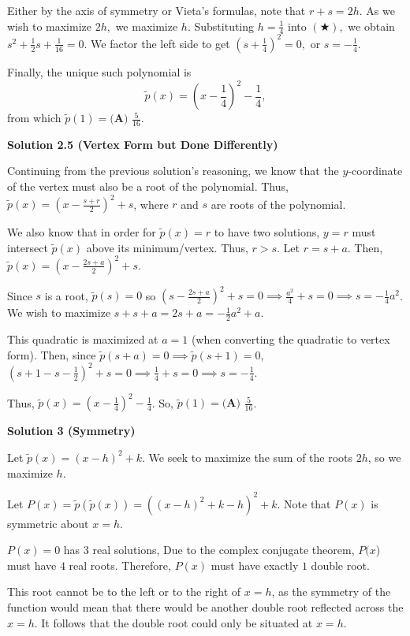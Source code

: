\begin{enumerate}
 Either by the axis of symmetry or Vieta's formulas, note that $r+s=2h.$ As we wish to maximize $2h,$ we maximize $h.$ Substituting $h=\frac14$ into $(\bigstar),$ we obtain $s^2+\frac12s+\frac{1}{16}=0.$ We factor the left side to get $\left(s+\frac14\right)^2=0,$ or $s=-\frac14.$

 Finally, the unique such polynomial is 
 \[\tilde{p}(x)=\left(x-\frac14\right)^2-\frac14,\] from which $\tilde{p}(1)=\boxed{\textbf{(A) } \frac{5}{16}}.$




\textbf{Solution 2.5 (Vertex Form but Done Differently)}

Continuing from the previous solution's reasoning, we know that the $y$-coordinate of the vertex must also be a root of the polynomial. Thus, $\tilde{p}(x) = \left(x - \frac{s + r}{2}\right)^2 + s$, where $r$ and $s$ are roots of the polynomial.

 We also know that in order for $\tilde{p}(x) = r$ to have two solutions, $y = r$ must intersect $\tilde{p}(x)$ above its minimum/vertex. Thus, $r > s$. Let $r = s + a$. Then, $\tilde{p}(x) = \left(x - \frac {2s + a}{2}\right)^2 + s$. 

 Since $s$ is a root, $\tilde{p}(s) = 0$ so $\left(s - \frac{2s + a}{2}\right)^2 +s = 0 \implies \frac{a^2}{4} + s = 0 \implies s = - \frac{1}{4} a^2$. We wish to maximize $s + s + a = 2s + a = - \frac{1}{2} a^2 + a$. 

 This quadratic is maximized at $a = 1$ (when converting the quadratic to vertex form). Then, since $\tilde{p}(s + a) = 0 \implies \tilde{p}(s+1) = 0$, $\left(s + 1 - s - \frac12\right)^2 + s = 0 \implies \frac{1}{4} + s = 0 \implies s = -\frac{1}{4}$. 

 Thus, $\tilde{p}(x) = \left(x - \frac{1}{4}\right)^2 - \frac{1}{4}$. So, $\tilde{p}(1) = \boxed{\textbf{(A) } \frac{5}{16}}$.

 



\textbf{Solution 3 (Symmetry)}

Let $\tilde p(x)=(x-h)^2+k$. We seek to maximize the sum of the roots $2h$, so we maximize $h$.

 Let $P(x)=\tilde p(\tilde p(x))=((x-h)^2+k-h)^2+k$. Note that $P(x)$ is symmetric about $x=h$. 

 $P(x)=0$ has $3$ real solutions, Due to the complex conjugate theorem, $P(x$) must have $4$ real roots. Therefore, $P(x)$ must have exactly $1$ double root. 

 This root cannot be to the left or to the right of $x=h$, as the symmetry of the function would mean that there would be another double root reflected across the $x=h$. It follows that the double root could only be situated at $x=h$. 


\end{enumerate}
